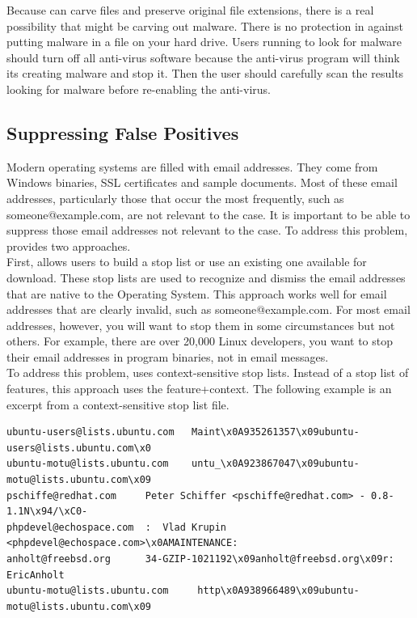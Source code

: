 \documentclass[11pt]{article} %
\begin{document}
Because \bulk can carve files and preserve original file extensions, there is a real possibility that \bulk might be carving out malware. There is no protection in \bulk against putting malware in a file on your hard drive. Users running \bulk to look for malware should turn off all anti-virus software because the anti-virus program will think its creating malware and stop it. Then the user should carefully scan the results looking for malware before re-enabling the anti-virus. \\


\subsection{Suppressing False Positives}
\label{StoppedLists}
Modern operating systems are filled with email addresses. They come from Windows binaries, SSL certificates and sample documents. Most of these email addresses, particularly those that occur the most frequently, such as someone@example.com, are not relevant to the case. It is important to be able to suppress those email addresses not relevant to the case. To address this problem, \bulk provides two approaches. \\

First, \bulk allows users to build a stop list or use an existing one available for download. These stop lists are used to recognize and dismiss the email addresses that are native to the Operating System. This approach works well for email addresses that are clearly invalid, such as someone@example.com. For most email addresses, however, you will want to stop them in some circumstances but not others. For example, there are over 20,000 Linux developers, you want to stop their email addresses in program binaries, not in email messages.\\

To address this problem, \bulk uses context-sensitive stop lists. Instead of a stop list of features, this approach uses the feature+context. The following example is an excerpt from a context-sensitive stop list file.

\lstset{style=customfile}
\begin{lstlisting}
ubuntu-users@lists.ubuntu.com   Maint\x0A935261357\x09ubuntu-users@lists.ubuntu.com\x0
ubuntu-motu@lists.ubuntu.com    untu_\x0A923867047\x09ubuntu-motu@lists.ubuntu.com\x09
pschiffe@redhat.com     Peter Schiffer <pschiffe@redhat.com> - 0.8-1.1N\x94/\xC0-
phpdevel@echospace.com  :  Vlad Krupin <phpdevel@echospace.com>\x0AMAINTENANCE:
anholt@freebsd.org      34-GZIP-1021192\x09anholt@freebsd.org\x09r: EricAnholt
ubuntu-motu@lists.ubuntu.com     http\x0A938966489\x09ubuntu-motu@lists.ubuntu.com\x09
\end{lstlisting}
\end{document}
